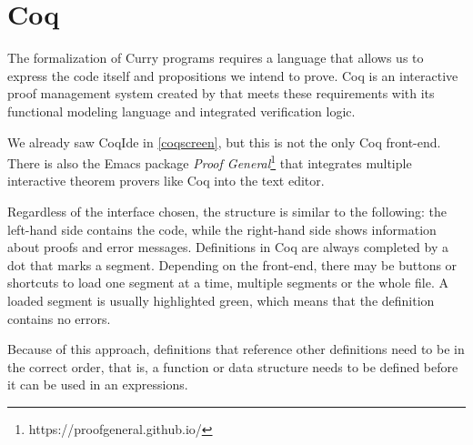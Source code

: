\documentclass[paper = a4, fleqn, abstract=on, twoside]{scrreprt}
\begin{document}
\section{Coq}
The formalization of Curry programs requires a language that allows us to express the code itself and propositions we intend to prove. Coq is an interactive proof management system created by \cite{CoqManualV8} that meets these requirements with its functional modeling language and integrated verification logic.
\par
We already saw CoqIde in \autoref{coqscreen}, but this is not the only Coq front-end. There is also the Emacs package \textit{Proof General}\footnote{https://proofgeneral.github.io/} that integrates multiple interactive theorem provers like Coq into the text editor.
\par 
Regardless of the interface chosen, the structure is similar to the following: the left-hand side contains the code, while the right-hand side shows information about proofs and error messages. Definitions in Coq are always completed by a dot that marks a segment. Depending on the front-end, there may be buttons or shortcuts to load one segment at a time, multiple segments or the whole file. A loaded segment is usually highlighted green, which means that the definition contains no errors.
\par
Because of this approach, definitions that reference other definitions need to be in the correct order, that is, a function or data structure needs to be defined before it can be used in an expressions.
\end{document}
